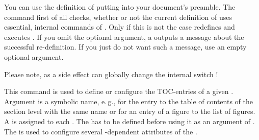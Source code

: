 You can use the definition of  putting
 into your document's preamble. The command first
of all checks, whether or not the current definition of 
uses essential, internal commands of . Only if this is not
the case  redefines  and
executes . If you omit the optional argument, a
 outputs a message about the successful re-definition. If
you just do not want such a message, use an empty optional argument.

Please note, as a side effect
 can globally change the internal switch
!%
\EndIndexGroup


\begin{Declaration}
\end{Declaration}
This command is used to define
or configure the TOC-entries of a given . Argument
 is a symbolic name, e.\,g.,  for the entry
to the table of contents of the section level with the same name or
 for an entry of a figure to the list of figures. A 
is assigned to each . The  has to be defined
before using it as an argument of . The
 is used to configure several -dependent
attributes of the .

